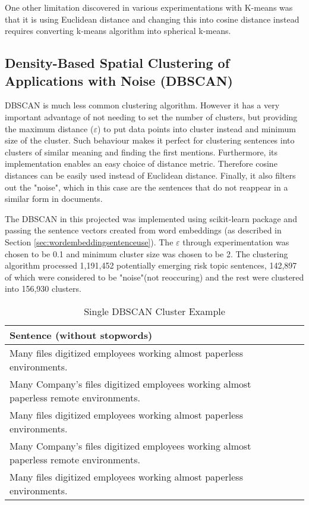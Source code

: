 {One other limitation discovered in various experimentations with K-means was that it is using Euclidean distance and changing this into cosine distance instead requires converting k-means algorithm into spherical k-means.

\subsection{Density-Based Spatial Clustering of Applications with Noise (DBSCAN)}
\label{sec:dbscanclusters}
DBSCAN is much less common clustering algorithm. However it has a very important advantage of not needing to set the number of clusters, but providing the maximum distance ($\varepsilon$) to put data points into cluster instead and minimum size of the cluster. Such behaviour makes it perfect for clustering sentences into clusters of similar meaning and finding the first mentions. Furthermore, its implementation enables an easy choice of distance metric. Therefore cosine distances can be easily used instead of Euclidean distance. Finally, it also filters out the "noise", which in this case are the sentences that do not reappear in a similar form in documents.

The DBSCAN in this projected was implemented using scikit-learn package \cite{sklearnhome} and passing the sentence vectors created from word embeddings (as described in Section \ref{sec:wordembeddingsentenceuse}). The $\varepsilon$ through experimentation was chosen to be 0.1 and minimum cluster size was chosen to be 2. The clustering algorithm processed 1,191,452 potentially emerging risk topic sentences, 142,897 of which were considered to be "noise"(not reoccuring) and the rest were clustered into 156,930 clusters.

\begin{table}[H]
\centering
\begin{tabular}{|Mc|}
\hline
Sentence (without stopwords) &\\
\hline
Many files digitized employees working almost paperless environments.&\\[5pt]\hline
Many Company's files digitized employees working almost paperless remote environments.&\\[5pt]\hline
Many files digitized employees working almost paperless environments.&\\[5pt]\hline
Many Company's files digitized employees working almost paperless remote environments.&\\[5pt]\hline
Many files digitized employees working almost paperless environments.&\\[5pt]\hline
\end{tabular}
\caption{Single DBSCAN Cluster Example}
\label{table:dbscanclusterexample}
\end{table}

}
